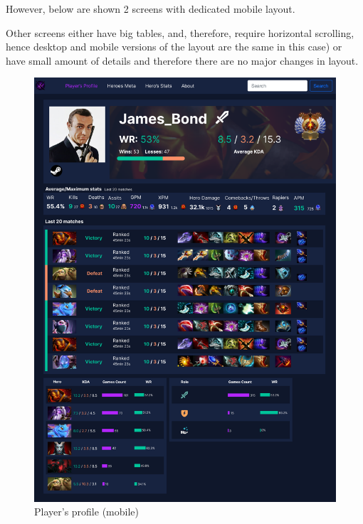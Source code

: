     \vspace{1em}
    However, below are shown 2 screens with dedicated mobile layout.

    \vspace{1em}
    Other screens either have big tables, and, therefore, require horizontal scrolling, hence desktop and mobile versions of the layout are the same in this case)
    or have small amount of details and therefore there are no major changes in layout.

    \begin{figure}[ht]
        \centering
        \begin{minipage}[t]{0.48\textwidth}
            \centering
            \includegraphics[width=\textwidth]{images/PlayerProfile_m}
            \caption{Player's profile (mobile)}
        \end{minipage}
        \hfill
        \begin{minipage}[t]{0.48\textwidth}

\end{minipage}
\end{figure}

